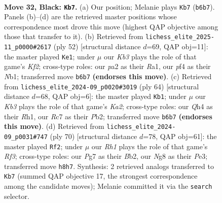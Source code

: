 \documentclass[11pt]{article}
\begin{document}
\clearpage

\begin{figure}[p]\centering
\begin{subfigure}{0.46\textwidth}\centering
\resizebox{\linewidth}{!}{%
\newchessgame
\chessboard[
  setfen={4Q1nr/2r3p1/1k6/2p3Pp/2P2P1q/N3B3/PP4K1/1R6 b - - 2 32},
  showmover=false,
  pgfstyle=straightmove, color=movearrow, markmove={b6-b7}
]}
\caption{}
\end{subfigure}\hfill
\begin{subfigure}{0.46\textwidth}\centering
\resizebox{\linewidth}{!}{%
\newchessgame
\chessboard[
  setfen={5r2/pp6/4k1p1/1q1p4/6n1/2P2pP1/P4K1P/RN1Q3R w - - 3 27},
  showmover=false,
  pgfstyle=straightmove, color=movearrow, markmove={f2-e1}
]}
\caption{}
\end{subfigure}
\\[4pt]
\begin{subfigure}{0.46\textwidth}\centering
\resizebox{\linewidth}{!}{%
\newchessgame
\chessboard[
  setfen={2r2b1k/p4p2/4pNp1/4P2p/q2P4/4Q3/KP6/3R3R w - - 1 33},
  showmover=false,
  pgfstyle=straightmove, color=movearrow, markmove={a2-b1}
]}
\caption{}
\end{subfigure}\hfill
\begin{subfigure}{0.46\textwidth}\centering
\resizebox{\linewidth}{!}{%
\newchessgame
\chessboard[
  setfen={3r2k1/p4pp1/4n2p/Q7/2p4P/P2qPR2/1B6/5NK1 w - - 0 36},
  showmover=false,
  pgfstyle=straightmove, color=movearrow, markmove={f3-f2}
]}
\caption{}
\end{subfigure}
\caption{\textbf{Move 32, Black: \texttt{Kb7}.} (a) Our position; Melanie plays \texttt{Kb7} (\texttt{b6b7}). Panels (b)--(d) are the retrieved master positions whose correspondence most drove this move (highest QAP objective among those that transfer to it). (b) Retrieved from \texttt{lichess\_elite\_2025-11\_p0000\#2617} (ply 52) [structural distance $d$=69, QAP obj=11]: the master played \texttt{Ke1}; under $\mu$ our \emph{Kb3} plays the role of that game's \emph{Kf2}; cross-type roles: our \emph{p}a2 as their \emph{R}a1, our \emph{p}f4 as their \emph{N}b1; transferred move \texttt{b6b7} \textbf{(endorses this move)}. (c) Retrieved from \texttt{lichess\_elite\_2024-09\_p0020\#3019} (ply 64) [structural distance $d$=68, QAP obj=6]: the master played \texttt{Kb1}; under $\mu$ our \emph{Kb3} plays the role of that game's \emph{Ka2}; cross-type roles: our \emph{Q}h4 as their \emph{R}h1, our \emph{R}c7 as their \emph{P}b2; transferred move \texttt{b6b7} \textbf{(endorses this move)}. (d) Retrieved from \texttt{lichess\_elite\_2024-09\_p0031\#747} (ply 70) [structural distance $d$=78, QAP obj=61]: the master played \texttt{Rf2}; under $\mu$ our \emph{Rh1} plays the role of that game's \emph{Rf3}; cross-type roles: our \emph{P}g7 as their \emph{B}b2, our \emph{N}g8 as their \emph{P}e3; transferred move \texttt{h8h7}. Synthesis: 2 retrieved analogs transferred to \texttt{Kb7} (summed QAP objective 17, the strongest correspondence among the candidate moves); Melanie committed it via the \texttt{search} selector.}
\label{fig:thought-m63}
\end{figure}
\end{document}
